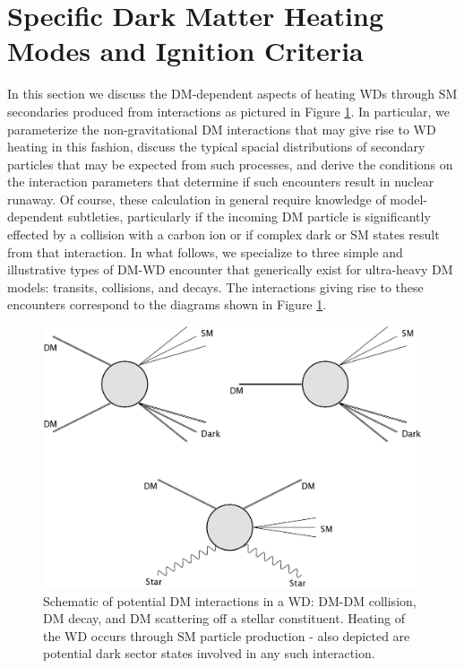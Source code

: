 \documentclass[twocolumn,showpacs,preprintnumbers,amsmath,amssymb,prd]{revtex4}
\begin{document}
\section{Specific Dark Matter Heating Modes and Ignition Criteria}
\label{sec:DMexplode}

In this section we discuss the DM-dependent aspects of heating WDs through SM secondaries produced from interactions as pictured in Figure \ref{fig:feynman}.
In particular, we parameterize the non-gravitational DM interactions that may give rise to WD heating in this fashion, discuss the typical spacial distributions of secondary particles that may be expected from such processes, and derive the conditions on the interaction parameters that determine if such encounters result in nuclear runaway.
Of course, these calculation in general require knowledge of model-dependent subtleties, particularly if the incoming DM particle is significantly effected by a collision with a carbon ion or if complex dark or SM states result from that interaction. 
In what follows, we specialize to three simple and illustrative types of DM-WD encounter that generically exist for ultra-heavy DM models: transits, collisions, and decays. 
The interactions giving rise to these encounters correspond to the diagrams shown in Figure \ref{fig:feynman}.

\begin{figure}
\includegraphics[scale=0.09]{feynmandiag.jpg}
\caption{Schematic of potential DM interactions in a WD: DM-DM collision, DM decay, and DM scattering off a stellar constituent.
Heating of the WD occurs through SM particle production - also depicted are potential dark sector states involved in any such interaction.}
\label{fig:feynman}
\end{figure}
\end{document}

